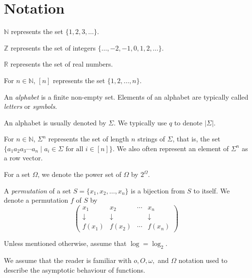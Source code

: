 \section{Notation}

$\mathbb{N}$ represents the set $\{1,2,3,\ldots\}$.

$\mathbb{Z}$ represents the set of integers $\{\ldots,-2,-1,0,1,2,\ldots\}$.

$\mathbb{R}$ represents the set of real numbers.

\vspace{2mm}
For $n\in\mathbb{N}$, $[n]$ represents the set $\{1,2,\ldots,n\}$.

\begin{definition}
    An \textit{alphabet} is a finite non-empty set. Elements of an alphabet are typically called \textit{letters} or \textit{symbols}.
\end{definition}

An alphabet is usually denoted by $\Sigma$. We typically use $q$ to denote $|\Sigma|$.

For $n\in\mathbb{N}$, $ \Sigma^n$ represents the set of length $n$ strings of $\Sigma$, that is, the set $\{a_1a_2a_3\cdots a_n\mid a_i\in\Sigma\text{ for all }i\in[n]\}$. We also often represent an element of $\Sigma^n$ as a row vector.

For a set $\Omega$, we denote the power set of $\Omega$ by $2^\Omega$.

\begin{definition}
    A \textit{permutation} of a set $S=\{x_1,x_2,\ldots,x_n\}$ is a bijection from $S$ to itself.  We denote a permutation $f$ of $S$ by
    $$\begin{pmatrix}x_1 & x_2 & \cdots & x_n \\ \downarrow & \downarrow & & \downarrow \\ f(x_1) & f(x_2) & \cdots & f(x_n)
    \end{pmatrix}$$
\end{definition}

Unless mentioned otherwise, assume that $\log=\log_2$.

We assume that the reader is familiar with $o, O, \omega,$ and $\Omega$ notation used to describe the asymptotic behaviour of functions.

\clearpage